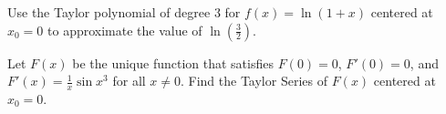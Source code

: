 \documentclass{ximera}
\begin{document}
\begin{question}%

Use the Taylor polynomial of degree \(3\) for \(f(x) = \ln (1+x)\) centered at \(x_0 = 0\) to approximate the value of \(\displaystyle \ln \left( \frac{3}{2} \right)\).
\begin{multiplechoice}
\end{multiplechoice}

\end{question}

\begin{question}%

Let \(F(x)\) be the unique function that satisfies \(F(0) = 0\), \(F'(0) = 0\), and \(F'(x) = \frac{1}{x} \sin x^3\) for all \(x \neq 0\). Find the Taylor Series of \(F(x)\) centered at \(x_0 = 0\).
\begin{multiplechoice}
\end{multiplechoice}

\end{question}
\end{document}
